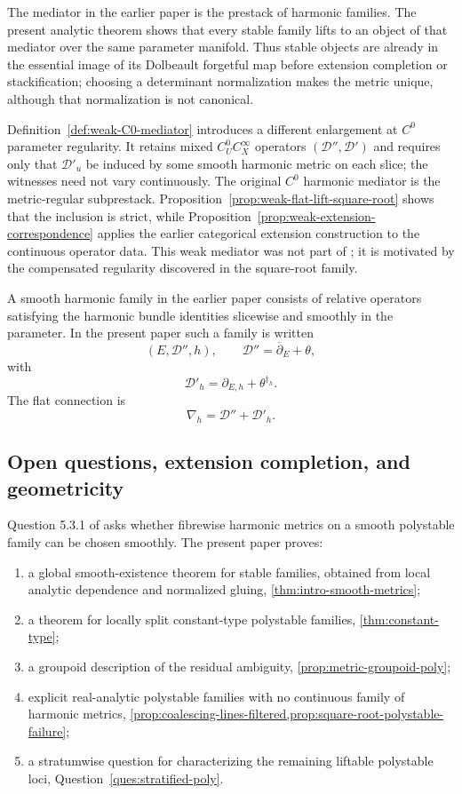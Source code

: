 \documentclass[11pt,reqno]{amsart}
\theoremstyle{definition}
\theoremstyle{remark}
\newcommand{\cD}{\mathcal D}
\newcommand{\ddbar}{\overline\partial}
\begin{document}
The mediator in the earlier paper is the prestack of harmonic families.  The present analytic theorem shows that every stable family lifts to an object of that mediator over the same parameter manifold.  Thus stable objects are already in the essential image of its Dolbeault forgetful map before extension completion or stackification; choosing a determinant normalization makes the metric unique, although that normalization is not canonical.

Definition~\ref{def:weak-C0-mediator} introduces a different enlargement at $C^0$ parameter regularity.  It retains mixed $C^0_UC^\infty_X$ operators $(\cD'',\cD')$ and requires only that $\cD'_u$ be induced by some smooth harmonic metric on each slice; the witnesses need not vary continuously.  The original $C^0$ harmonic mediator is the metric-regular subprestack.  Proposition~\ref{prop:weak-flat-lift-square-root} shows that the inclusion is strict, while Proposition~\ref{prop:weak-extension-correspondence} applies the earlier categorical extension construction to the continuous operator data.  This weak mediator was not part of \cite{AzamRayan2026}; it is motivated by the compensated regularity discovered in the square-root family.


A smooth harmonic family in the earlier paper consists of relative operators satisfying the harmonic bundle identities slicewise and smoothly in the parameter.  In the present paper such a family is written
\[
  (E,\cD'',h),
  \qquad
  \cD''=\ddbar_E+\theta,
\]
with
\[
  \cD'_h=\partial_{E,h}+\theta^{\dagger_h}.
\]
The flat connection is
\[
  \nabla_h=\cD''+\cD'_h.
\]

\subsection{Open questions, extension completion, and geometricity}

Question 5.3.1 of \cite{AzamRayan2026} asks whether fibrewise harmonic metrics on a smooth polystable family can be chosen smoothly.  The present paper proves:
\begin{enumerate}[label=(\roman*)]
\item a global smooth-existence theorem for stable families, obtained from local analytic dependence and normalized gluing, \cref{thm:intro-smooth-metrics};
\item a theorem for locally split constant-type polystable families, \cref{thm:constant-type};
\item a groupoid description of the residual ambiguity, \cref{prop:metric-groupoid-poly};
\item explicit real-analytic polystable families with no continuous family of harmonic metrics, \cref{prop:coalescing-lines-filtered,prop:square-root-polystable-failure};
\item a stratumwise question for characterizing the remaining liftable polystable loci, Question~\ref{ques:stratified-poly}.
\end{enumerate}
\end{document}
